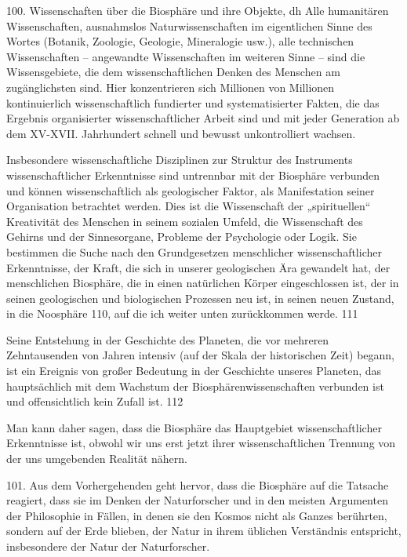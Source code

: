 \documentclass[11pt,a4paper]{book}
\begin{document}
100. Wissenschaften über die Biosphäre und ihre Objekte, dh Alle humanitären Wissenschaften, ausnahmslos Naturwissenschaften im eigentlichen Sinne des Wortes (Botanik, Zoologie, Geologie, Mineralogie usw.), alle technischen Wissenschaften -- angewandte Wissenschaften im weiteren Sinne -- sind die Wissensgebiete, die dem wissenschaftlichen Denken des Menschen am zugänglichsten sind. Hier konzentrieren sich Millionen von Millionen kontinuierlich wissenschaftlich fundierter und systematisierter Fakten, die das Ergebnis organisierter wissenschaftlicher Arbeit sind und mit jeder Generation ab dem XV-XVII. Jahrhundert schnell und bewusst unkontrolliert wachsen.



Insbesondere wissenschaftliche Disziplinen zur Struktur des Instruments wissenschaftlicher Erkenntnisse sind untrennbar mit der Biosphäre verbunden und können wissenschaftlich als geologischer Faktor, als Manifestation seiner Organisation betrachtet werden. Dies ist die Wissenschaft der „spirituellen“ Kreativität des Menschen in seinem sozialen Umfeld, die Wissenschaft des Gehirns und der Sinnesorgane, Probleme der Psychologie oder Logik. Sie bestimmen die Suche nach den Grundgesetzen menschlicher wissenschaftlicher Erkenntnisse, der Kraft, die sich in unserer geologischen Ära gewandelt hat, der menschlichen Biosphäre, die in einen natürlichen Körper eingeschlossen ist, der in seinen geologischen und biologischen Prozessen neu ist, in seinen neuen Zustand, in die Noosphäre 110, auf die ich weiter unten zurückkommen werde. 111



Seine Entstehung in der Geschichte des Planeten, die vor mehreren Zehntausenden von Jahren intensiv (auf der Skala der historischen Zeit) begann, ist ein Ereignis von großer Bedeutung in der Geschichte unseres Planeten, das hauptsächlich mit dem Wachstum der Biosphärenwissenschaften verbunden ist und offensichtlich kein Zufall ist. 112



Man kann daher sagen, dass die Biosphäre das Hauptgebiet wissenschaftlicher Erkenntnisse ist, obwohl wir uns erst jetzt ihrer wissenschaftlichen Trennung von der uns umgebenden Realität nähern.



101. Aus dem Vorhergehenden geht hervor, dass die Biosphäre auf die Tatsache reagiert, dass sie im Denken der Naturforscher und in den meisten Argumenten der Philosophie in Fällen, in denen sie den Kosmos nicht als Ganzes berührten, sondern auf der Erde blieben, der Natur in ihrem üblichen Verständnis entspricht, insbesondere der Natur der Naturforscher.
\end{document}
